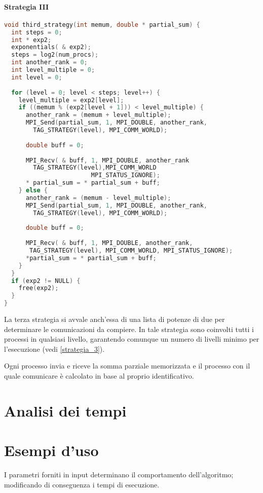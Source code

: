 \documentclass[a4paper,11pt]{book}
\begin{document}
\subsubsection{Strategia III}
\begin{lstlisting}[language=C]
void third_strategy(int memum, double * partial_sum) {
  int steps = 0;
  int * exp2;
  exponentials( & exp2);
  steps = log2(num_procs);
  int another_rank = 0;
  int level_multiple = 0;
  int level = 0;
  
  for (level = 0; level < steps; level++) {
    level_multiple = exp2[level];
    if ((memum % (exp2[level + 1])) < level_multiple) {
      another_rank = (memum + level_multiple);
      MPI_Send(partial_sum, 1, MPI_DOUBLE, another_rank,
        TAG_STRATEGY(level), MPI_COMM_WORLD);
      
      double buff = 0;
      
      MPI_Recv( & buff, 1, MPI_DOUBLE, another_rank
        TAG_STRATEGY(level),MPI_COMM_WORLD   
                        MPI_STATUS_IGNORE);
      * partial_sum = * partial_sum + buff;
    } else {
      another_rank = (memum - level_multiple);
      MPI_Send(partial_sum, 1, MPI_DOUBLE, another_rank,
        TAG_STRATEGY(level), MPI_COMM_WORLD);
      
      double buff = 0;
      
      MPI_Recv( & buff, 1, MPI_DOUBLE, another_rank,
       TAG_STRATEGY(level), MPI_COMM_WORLD, MPI_STATUS_IGNORE);
      *partial_sum = * partial_sum + buff;
    }
  }
  if (exp2 != NULL) {
    free(exp2);
  }
}
\end{lstlisting}
La terza strategia si avvale anch'essa di una lista di potenze di due per determinare le comunicazioni da compiere. In tale strategia sono coinvolti tutti i processi in qualsiasi livello, garantendo comunque un numero di livelli minimo per l'esecuzione (vedi \ref{strategia_3}).\par 
Ogni processo invia e riceve la somma parziale memorizzata e il processo con il quale comunicare  è calcolato in base al proprio identificativo.

\chapter{Analisi dei tempi}
\chapter{Esempi d'uso}
I parametri forniti in input determinano il comportamento dell'algoritmo; modificando di conseguenza i tempi di esecuzione. \par 
\end{document}
